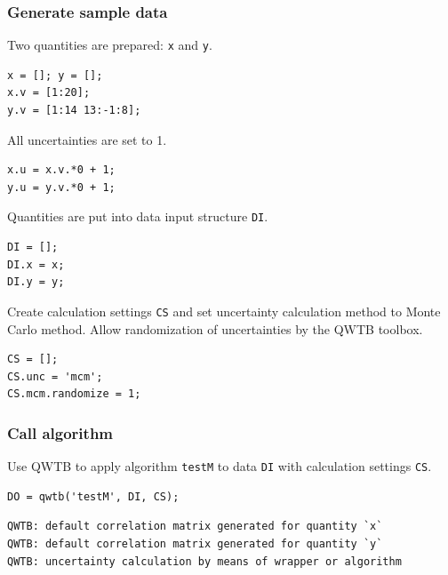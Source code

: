 \startcontents[localtoc]



{}
\subsubsection*{Generate sample data}



Two quantities are prepared: \texttt{x} and \texttt{y}.

\begin{lstlisting}
x = []; y = [];
x.v = [1:20];
y.v = [1:14 13:-1:8];
\end{lstlisting}


All uncertainties are set to 1.

\begin{lstlisting}
x.u = x.v.*0 + 1;
y.u = y.v.*0 + 1;
\end{lstlisting}


Quantities are put into data input structure \texttt{DI}.

\begin{lstlisting}
DI = [];
DI.x = x;
DI.y = y;
\end{lstlisting}


Create calculation settings \texttt{CS} and set uncertainty calculation method to Monte Carlo method.
Allow randomization of uncertainties by the QWTB toolbox.

\begin{lstlisting}
CS = [];
CS.unc = 'mcm';
CS.mcm.randomize = 1;
\end{lstlisting}


{}
\subsubsection*{Call algorithm}



Use QWTB to apply algorithm \texttt{testM} to data \texttt{DI} with calculation settings \texttt{CS}.

\begin{lstlisting}
DO = qwtb('testM', DI, CS);
\end{lstlisting}
\begin{lstlisting}[language={},xleftmargin=5pt,frame=none]
QWTB: default correlation matrix generated for quantity `x`
QWTB: default correlation matrix generated for quantity `y`
QWTB: uncertainty calculation by means of wrapper or algorithm

\end{lstlisting}


